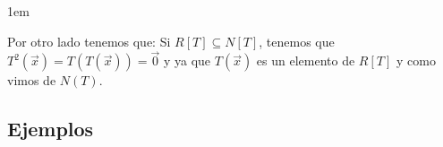 \documentclass[12pt, fleqn]{report}                             %
\newenvironment{SmallIndentation}[1][0.75em]                    %
        {\begin{adjustwidth}{#1}{}\begin{footnotesize}}             %
        {\end{footnotesize}\end{adjustwidth}}                       %
\theoremstyle{break}                                            %
\begin{document}
\begin{itemize}
\begin{SmallIndentation}[1em]
                            Por otro lado tenemos que:
                            Si $R[T] \subseteq N[T]$, tenemos que $T^2(\vec x) = T(T(\vec x)) = \vec 0$ 
                            y ya que $T(\vec x)$ es un elemento de $R[T]$ y como vimos de $N(T)$.
                        
                        \end{SmallIndentation}
                            
                            

                \end{itemize}


            \clearpage
            \subsection{Ejemplos}
\end{document}
